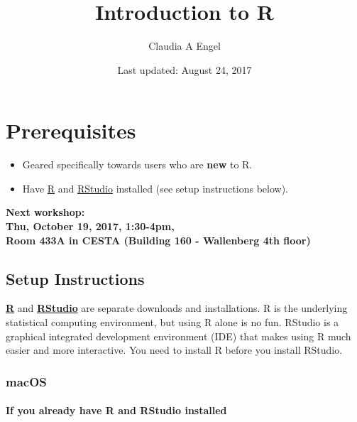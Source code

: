 \documentclass[]{book}
\title{Introduction to R}
\author{Claudia A Engel}
\date{Last updated: August 24, 2017}
\providecommand{\tightlist}{%
  \setlength{\itemsep}{0pt}\setlength{\parskip}{0pt}}
\theoremstyle{definition}
\theoremstyle{definition}
\theoremstyle{remark}
\begin{document}
\maketitle

{
\setcounter{tocdepth}{1}
\tableofcontents
}
\chapter*{Prerequisites}\label{prerequisites}

\begin{itemize}
\tightlist
\item
  Geared specifically towards users who are \textbf{new} to R.\\
\item
  Have \href{https://cran.r-project.org/}{R} and
  \href{https://www.rstudio.com/}{RStudio} installed (see setup
  instructions below).
\end{itemize}

\textbf{Next workshop:\\
Thu, October 19, 2017, 1:30-4pm,\\
Room 433A in CESTA (Building 160 - Wallenberg 4th floor)}

\section*{Setup Instructions}\label{setup-instructions}

\href{https://cran.r-project.org/}{\textbf{R}} and
\href{https://www.rstudio.com/}{\textbf{RStudio}} are separate downloads
and installations. R is the underlying statistical computing
environment, but using R alone is no fun. RStudio is a graphical
integrated development environment (IDE) that makes using R much easier
and more interactive. You need to install R before you install RStudio.

\subsection*{macOS}\label{macos}

\subsubsection*{If you already have R and RStudio
installed}\label{if-you-already-have-r-and-rstudio-installed}
\end{document}
